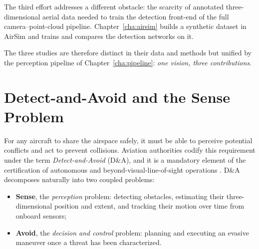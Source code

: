 The third effort addresses a different obstacle: the scarcity of annotated
three-dimensional aerial data needed to train the detection front-end of the
full camera--point-cloud pipeline. Chapter~\ref{cha:airsim} builds a synthetic
dataset in AirSim and trains and compares the detection networks on it.

The three studies are therefore distinct in their data and methods but unified by
the perception pipeline of Chapter~\ref{cha:pipeline}: \emph{one vision, three
contributions}.

\section{Detect-and-Avoid and the Sense Problem}

For any aircraft to share the airspace safely, it must be able to perceive
potential conflicts and act to prevent collisions. Aviation authorities codify
this requirement under the term \emph{Detect-and-Avoid} (D\&A), and it is a
mandatory element of the certification of autonomous and beyond-visual-line-of-sight
operations \cite{rtca2017do365}.
D\&A decomposes naturally into two coupled problems:

\begin{itemize}
  \item \textbf{Sense}, the \emph{perception} problem: detecting obstacles,
  estimating their three-dimensional position and extent, and tracking their
  motion over time from onboard sensors;
  \item \textbf{Avoid}, the \emph{decision and control} problem: planning and
  executing an evasive maneuver once a threat has been characterized.
\end{itemize}

